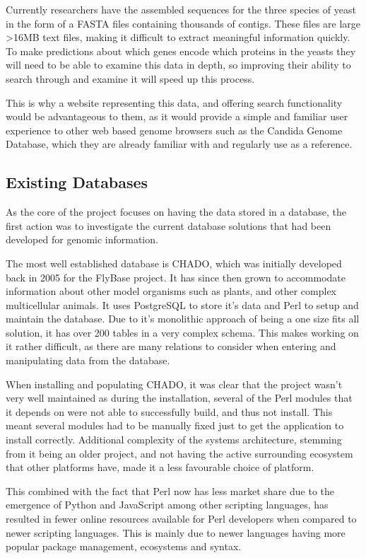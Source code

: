 Currently researchers have the assembled sequences for the three species of yeast in the form of a FASTA files containing thousands of contigs. These files are large \textgreater 16MB text files, making it difficult to extract meaningful information quickly. To make predictions about which genes encode which proteins in the yeasts they will need to be able to examine this data in depth, so improving their ability to search through and examine it will speed up this process.

This is why a website representing this data, and offering search functionality would be advantageous to them, as it would provide a simple and familiar user experience to other web based genome browsers such as the Candida Genome Database\cite{cgd}, which they are already familiar with and regularly use as a reference. 

\subsection{Existing Databases}
As the core of the project focuses on having the data stored in a database, the first action was to investigate the current database solutions that had been developed for genomic information. 

The most well established database is CHADO\cite{chado}, which was initially developed back in 2005 for the FlyBase\cite{flybase} project. It has since then grown to accommodate information about other model organisms such as plants, and other complex multicellular animals. It uses PostgreSQL\cite{postgres} to store it's data and Perl\cite{perl} to setup and maintain the database. Due to it's monolithic approach of being a one size fits all solution, it has over 200 tables in a very complex schema. This makes working on it rather difficult, as there are many relations to consider when entering and manipulating data from the database.

When installing and populating CHADO, it was clear that the project wasn't very well maintained as during the installation, several of the Perl modules that it depends on were not able to successfully build, and thus not install. This meant several modules had to be manually fixed just to get the application to install correctly. Additional complexity of the systems architecture, stemming from it being an older project, and not having the active surrounding ecosystem that other platforms have, made it a less favourable choice of platform.

This combined with the fact that Perl now has less market share\cite{perl-market} due to the emergence of Python\cite{python} and JavaScript\cite{node} among other scripting languages, has resulted in fewer online resources available for Perl developers when compared to newer scripting languages. This is mainly due to newer languages having more popular package management, ecosystems and syntax. 

